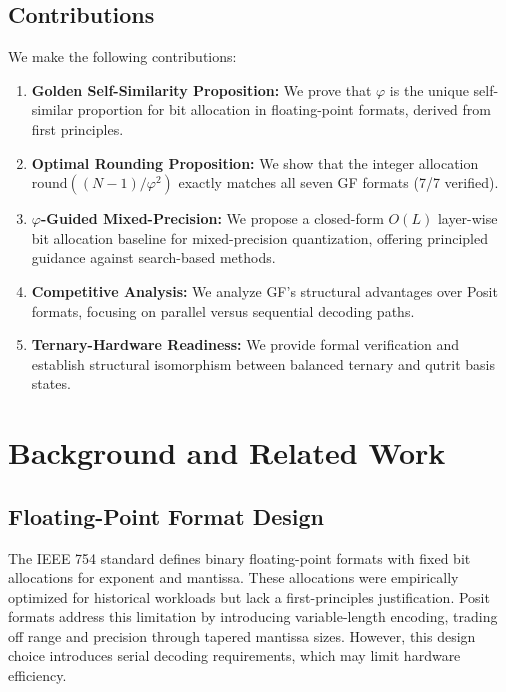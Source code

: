\documentclass{article}
\begin{document}
\subsection{Contributions}

We make the following contributions:

\begin{enumerate}
    \item \textbf{Golden Self-Similarity Proposition:} We prove that $\varphi$ is the unique self-similar proportion for bit allocation in floating-point formats, derived from first principles.
    \item \textbf{Optimal Rounding Proposition:} We show that the integer allocation $\text{round}((N-1)/\varphi^2)$ exactly matches all seven GF formats (7/7 verified).
    \item \textbf{$\varphi$-Guided Mixed-Precision:} We propose a closed-form $O(L)$ layer-wise bit allocation baseline for mixed-precision quantization, offering principled guidance against search-based methods.
    \item \textbf{Competitive Analysis:} We analyze GF's structural advantages over Posit formats, focusing on parallel versus sequential decoding paths.
    \item \textbf{Ternary-Hardware Readiness:} We provide formal verification and establish structural isomorphism between balanced ternary and qutrit basis states.
\end{enumerate}


\section{Background and Related Work}

\subsection{Floating-Point Format Design}

The IEEE 754 standard \cite{ieee754_2019} defines binary floating-point formats with fixed bit allocations for exponent and mantissa. These allocations were empirically optimized for historical workloads but lack a first-principles justification. Posit formats \cite{gustafson2017} address this limitation by introducing variable-length encoding, trading off range and precision through tapered mantissa sizes. However, this design choice introduces serial decoding requirements, which may limit hardware efficiency.
\end{document}

